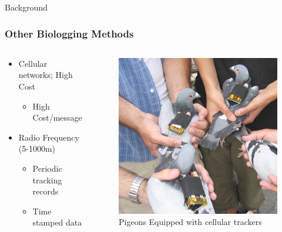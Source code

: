 \documentclass{beamer}
\begin{document}
\begin{frame}{Background}
  \frametitle{Other Biologging Methods}
  \begin{columns}
    \begin{column}{0.5\textwidth}
        \begin{itemize}
          \item Cellular networks; High Cost
          \begin{itemize}
            \item High Cost/message
          \end{itemize}
          \item Radio Frequency (5-1000m)
          \begin{itemize}
            \item Periodic tracking records
            \item Time stamped data
          \end{itemize}
        \end{itemize}
      \end{column}
      \begin{column}{.5\textwidth}
        \begin{figure}[htbp]
          \centering
          \includegraphics[width=\textwidth]{PigeonCellular.jpg}
          \caption{Pigeons Equipped with cellular trackers \cite{Martin_2006}}
          \label{fig:PigeonCellular}
        \end{figure}
      \end{column}
    \end{columns}
\end{frame}
\end{document}
